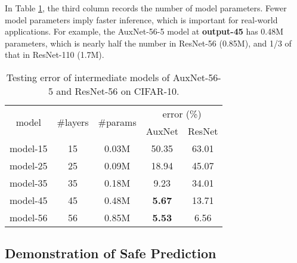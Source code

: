 \documentclass[10pt,onecolumn,letterpaper]{article}
\def\SexyName{AuxNet\xspace}
\begin{document}
In Table \ref{tab:intermediate}, the third column records the number of model parameters. Fewer model parameters imply faster inference, which is important for real-world applications. For example, the \SexyName-56-5 model at \textbf{output-45} has 0.48M parameters, which is nearly half the number in ResNet-56 (0.85M), and 1/3 of that in ResNet-110 (1.7M).

\begin{table}[htbp]
  \centering
  \caption{Testing error of intermediate models of \SexyName-56-5 and ResNet-56 on CIFAR-10.}
    \begin{tabular}{c|c|c|c|c}
    \hline
    \multirow{2}[0]{*}{model} & \multirow{2}[0]{*}{\#layers} & \multirow{2}[0]{*}{\#params} & \multicolumn{2}{c}{error (\%)} \\
    \cline{4-5}
          &       &       & \SexyName & ResNet \\
    \hline
    model-15 & 15    & 0.03M & 50.35 & 63.01 \\
    model-25 & 25    & 0.09M & 18.94 & 45.07 \\
    model-35 & 35    & 0.18M & 9.23  & 34.01 \\
    model-45 & 45    & 0.48M & \textbf{5.67}  & 13.71 \\
    model-56 & 56    & 0.85M & \textbf{5.53}  & 6.56 \\
    \hline
    \end{tabular}
  \label{tab:intermediate}
\end{table}

\subsection{Demonstration of Safe Prediction}\label{exp:ensemble}
\end{document}
